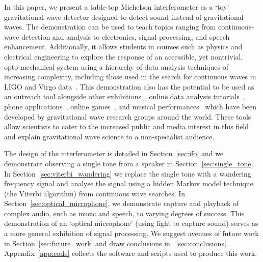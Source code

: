 \documentclass[paper-main.tex]{subfiles}
\begin{document}
In this paper, we present a table-top Michelson interferometer as a `toy' gravitational-wave detector designed to detect sound instead of gravitational waves. 
The demonstration can be used to teach topics ranging from continuous-wave detection and analysis to electronics, signal processing, and speech enhancement. 
Additionally, it allows students in courses such as physics and electrical engineering to explore the response of an accessible, yet nontrivial, opto-mechanical system using a hierarchy of data analysis techniques of increasing complexity, including those used in the search for continuous waves in LIGO and Virgo data~\cite{ScoX1O2Viterbi:2019, SuvorovaEtAl:2017,SuvorovaEtAl:2016}. 
This demonstration also has the potential to be used as an outreach tool alongside other exhibitions~\cite{TTExhibit:2020,LIGOScienceEducationCentre:online,GravityDiscoveryCentre:online}, online data analysis tutorials~\cite{GWOSC:online,LOSC:2015}, phone applications~\cite{LaserLabs:online,SciVR:online,chirp:online}, online games~\cite{BlackHoleHunter:online}, and musical performances~\cite{ArthurJeffesMusic:online,GravitySynthLeonTrimble:online} which have been developed by gravitational wave research groups around the world. These tools allow scientists to cater to the increased public and media interest in this field and explain gravitational wave science to a non-specialist audience.


The design of the interferometer is detailed in Section~\ref{sec:ifo} and we demonstrate observing a single tone from a speaker in Section~\ref{sec:single_tone}. 
In Section~\ref{sec:viterbi_wandering} we replace the single tone with a wandering frequency signal and analyse the signal using a hidden Markov model technique (the Viterbi algorithm) from continuous wave searches. 
In Section~\ref{sec:optical_microphone}, we demonstrate capture and playback of complex audio, such as music and speech, to varying degrees of success.
This demonstration of an ‘optical microphone’ (using light to capture sound) serves as a more general exhibition of signal processing. 
We suggest avenues of future work in Section~\ref{sec:future_work} and draw conclusions in ~\ref{sec:conclusions}. 
Appendix~\ref{app:code} collects the software and scripts used to produce this work.
\end{document}
